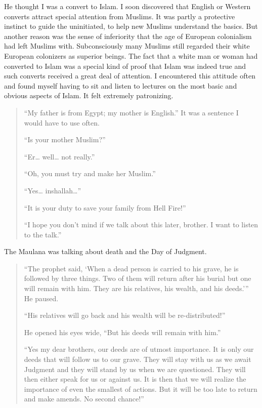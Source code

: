 \documentclass[12pt]{memoir}
\newcommand{\cmt}[2]{#1} %
\begin{document}
He thought I was a convert to Islam.
I soon discovered that English or Western converts
attract special attention from Muslims.
It was partly a protective instinct to guide the uninitiated,
to help new Muslims understand the basics.
But another reason was the sense of inferiority
that the age of European colonialism had left Muslims with.
Subconsciously many Muslims still regarded
their white European colonizers as superior beings.
The fact that a white man or woman had converted to Islam
was a special kind of proof that Islam was indeed true
and such converts received a great deal of attention.
I encountered this attitude often and found myself having to sit
and listen to lectures on the most basic and obvious aspects of Islam.
It felt extremely patronizing.

\begin{quote}
“My father is from Egypt; my mother is English.”
It was a sentence I would have to use often.

“Is your mother Muslim?”

“Er… well… not really.”

“Oh, you must try and make her Muslim.”

“Yes… inshallah…”

“It is your duty to save your family from Hell Fire!”

“I hope you don’t mind if we talk about this later, brother.
I want to listen to the talk.”
\end{quote}

The Maulana was talking about death and the Day of Judgment.

\begin{quote}
“The prophet said,
‘When a dead person is carried to his grave,
he is followed by three things.
Two of them will return after his burial but one will remain with him.
They are his relatives, his wealth, and his deeds.’”
He paused.

“His relatives will go back
and his wealth will be \cmt{re-distributed}{redistributed}!”

He opened his eyes wide, “But his deeds will remain with him.”

“Yes my dear brothers, our deeds are of utmost importance.
It is only our deeds that will follow us to our grave.
They will stay with us as we await Judgment
and they will stand by us when we are questioned.
They will then either speak for us or against us.
It is then that we will realize the importance of even the smallest of actions.
But it will be too late to return and make amends.
No second chance!”
\end{quote}
\end{document}
